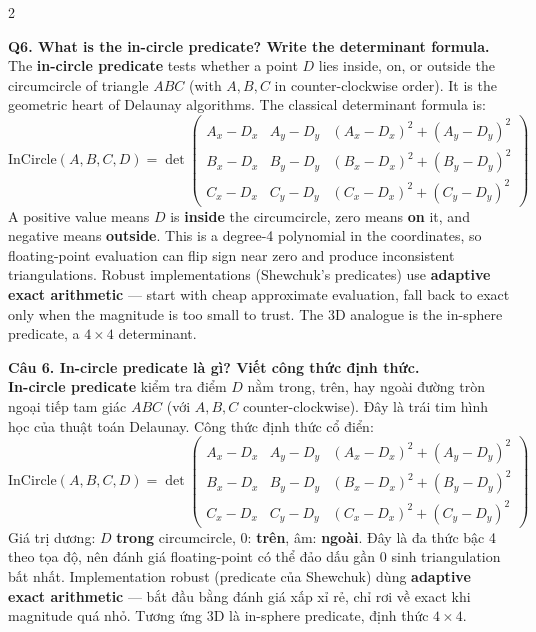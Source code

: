 \begin{paracol}{2}
\switchcolumn*

\textbf{Q6. What is the in-circle predicate? Write the determinant formula.}\\
The \textbf{in-circle predicate} tests whether a point $D$ lies inside, on, or outside the circumcircle of triangle $ABC$ (with $A,B,C$ in counter-clockwise order). It is the geometric heart of Delaunay algorithms. The classical determinant formula is:
\[
\mathrm{InCircle}(A,B,C,D) = \det \begin{pmatrix}
A_x - D_x & A_y - D_y & (A_x - D_x)^2 + (A_y - D_y)^2 \\
B_x - D_x & B_y - D_y & (B_x - D_x)^2 + (B_y - D_y)^2 \\
C_x - D_x & C_y - D_y & (C_x - D_x)^2 + (C_y - D_y)^2
\end{pmatrix}
\]
A positive value means $D$ is \textbf{inside} the circumcircle, zero means \textbf{on} it, and negative means \textbf{outside}. This is a degree-4 polynomial in the coordinates, so floating-point evaluation can flip sign near zero and produce inconsistent triangulations. Robust implementations (Shewchuk's predicates) use \textbf{adaptive exact arithmetic} — start with cheap approximate evaluation, fall back to exact only when the magnitude is too small to trust. The 3D analogue is the in-sphere predicate, a $4\times 4$ determinant.

\switchcolumn

\textbf{Câu 6. In-circle predicate là gì? Viết công thức định thức.}\\
\textbf{In-circle predicate} kiểm tra điểm $D$ nằm trong, trên, hay ngoài đường tròn ngoại tiếp tam giác $ABC$ (với $A,B,C$ counter-clockwise). Đây là trái tim hình học của thuật toán Delaunay. Công thức định thức cổ điển:
\[
\mathrm{InCircle}(A,B,C,D) = \det \begin{pmatrix}
A_x - D_x & A_y - D_y & (A_x - D_x)^2 + (A_y - D_y)^2 \\
B_x - D_x & B_y - D_y & (B_x - D_x)^2 + (B_y - D_y)^2 \\
C_x - D_x & C_y - D_y & (C_x - D_x)^2 + (C_y - D_y)^2
\end{pmatrix}
\]
Giá trị dương: $D$ \textbf{trong} circumcircle, 0: \textbf{trên}, âm: \textbf{ngoài}. Đây là đa thức bậc 4 theo tọa độ, nên đánh giá floating-point có thể đảo dấu gần 0 sinh triangulation bất nhất. Implementation robust (predicate của Shewchuk) dùng \textbf{adaptive exact arithmetic} — bắt đầu bằng đánh giá xấp xỉ rẻ, chỉ rơi về exact khi magnitude quá nhỏ. Tương ứng 3D là in-sphere predicate, định thức $4\times 4$.


\end{paracol}
